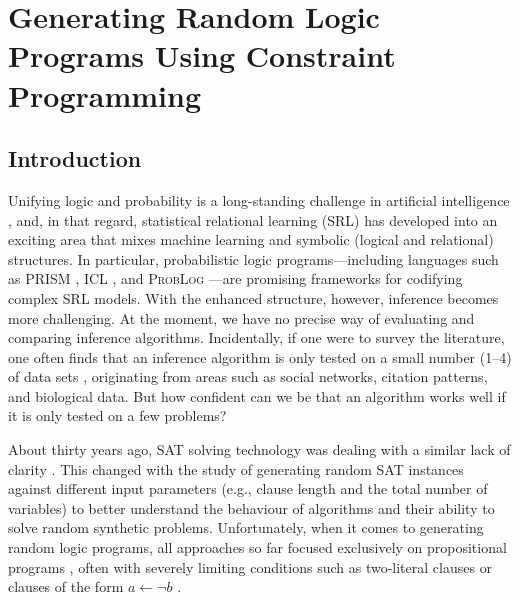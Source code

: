 \chapter{Generating Random Logic Programs Using Constraint
  Programming}\label{chapter:randomlps}

\section{Introduction}


Unifying logic and probability is a long-standing challenge in artificial
intelligence \citep{DBLP:journals/cacm/Russell15}, and, in that regard,
statistical relational learning (SRL) has developed into an exciting area that
mixes machine learning and symbolic (logical and relational) structures. In
particular, probabilistic logic programs---including languages such as
\textsc{PRISM} \citep{DBLP:conf/ijcai/SatoK97}, \textsc{ICL}
\citep{DBLP:journals/ai/Poole97}, and \textsc{ProbLog}
\citep{DBLP:conf/ijcai/RaedtKT07}---are promising frameworks for codifying
complex SRL models. With the enhanced structure, however, inference becomes more
challenging. At the moment, we have no precise way of evaluating and comparing
inference algorithms. Incidentally, if one were to survey the literature, one
often finds that an inference algorithm is only tested on a small number (1--4)
of data sets
\citep{DBLP:conf/ecai/BruynoogheMKGVJR10,DBLP:journals/tplp/KimmigDRCR11,DBLP:conf/ijcai/VlasselaerBKMR15},
originating from areas such as social networks, citation patterns, and
biological data. But how confident can we be that an algorithm works well if it
is only tested on a few problems?

About thirty years ago, SAT solving technology was dealing with a similar lack
of clarity \citep{DBLP:journals/ai/SelmanML96}. This changed with the study of
generating random SAT instances against different input parameters (e.g.,
clause length and the total number of variables) to better understand the
behaviour of algorithms and their ability to solve random synthetic problems.
Unfortunately, when it comes to generating random logic programs, all approaches
so far focused exclusively on propositional programs
\citep{DBLP:conf/ijcai/AmendolaRT17,DBLP:journals/ai/AmendolaRT20,DBLP:journals/tplp/WangWM15,DBLP:conf/iclp/ZhaoL03},
often with severely limiting conditions such as two-literal clauses
\citep{DBLP:conf/iclp/Namasivayam09,DBLP:conf/lpnmr/NamasivayamT09} or clauses of
the form $a \gets \neg b$ \citep{DBLP:journals/tocl/WenWSL16}.

